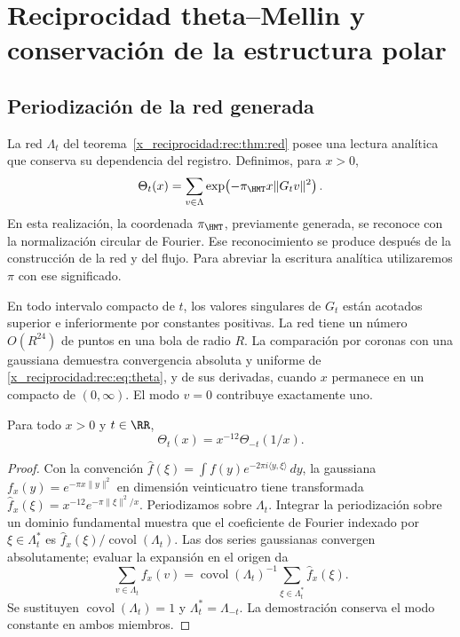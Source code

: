 \chapter{Reciprocidad theta--Mellin y conservación de la estructura polar}
\label{x_reciprocidad:rec:espectral}

\section{Periodización de la red generada}

La red \(\Lambda_t\) del teorema~\ref{x_reciprocidad:rec:thm:red} posee una lectura analítica que conserva su dependencia del registro. Definimos, para \(x>0\),
\begin{equation}
 \Theta_t(x)=\sum_{v\in\Lambda}
       \exp\!\left(-\pi_{\HMT}x\|G_tv\|^2\right).
 \label{x_reciprocidad:rec:eq:theta}
\end{equation}
En esta realización, la coordenada \(\pi_{\HMT}\), previamente generada, se reconoce con la normalización circular de Fourier. Ese reconocimiento se produce después de la construcción de la red y del flujo. Para abreviar la escritura analítica utilizaremos \(\pi\) con ese significado.

En todo intervalo compacto de \(t\), los valores singulares de \(G_t\) están acotados superior e inferiormente por constantes positivas. La red tiene un número \(O(R^{24})\) de puntos en una bola de radio \(R\). La comparación por coronas con una gaussiana demuestra convergencia absoluta y uniforme de \eqref{x_reciprocidad:rec:eq:theta}, y de sus derivadas, cuando \(x\) permanece en un compacto de \((0,\infty)\). El modo \(v=0\) contribuye exactamente uno.

\begin{theorem}
\label{x_reciprocidad:rec:thm:theta}
Para todo \(x>0\) y \(t\in\RR\),
\begin{equation}
 \Theta_t(x)=x^{-12}\Theta_{-t}(1/x).
 \label{x_reciprocidad:rec:eq:theta-reciproca}
\end{equation}
\end{theorem}
\begin{proof}
Con la convención \(\widehat f(\xi)=\int f(y)e^{-2\pi i\langle y,\xi\rangle}\,dy\), la gaussiana \(f_x(y)=e^{-\pi x\|y\|^2}\) en dimensión veinticuatro tiene transformada
\(\widehat f_x(\xi)=x^{-12}e^{-\pi\|\xi\|^2/x}\).
Periodizamos sobre \(\Lambda_t\). Integrar la periodización sobre un dominio fundamental muestra que el coeficiente de Fourier indexado por \(\xi\in\Lambda_t^*\) es \(\widehat f_x(\xi)/\operatorname{covol}(\Lambda_t)\). Las dos series gaussianas convergen absolutamente; evaluar la expansión en el origen da
\[
 \sum_{v\in\Lambda_t}f_x(v)
 =\operatorname{covol}(\Lambda_t)^{-1}
   \sum_{\xi\in\Lambda_t^*}\widehat f_x(\xi).
\]
Se sustituyen \(\operatorname{covol}(\Lambda_t)=1\) y \(\Lambda_t^*=\Lambda_{-t}\). La demostración conserva el modo constante en ambos miembros.
\end{proof}

